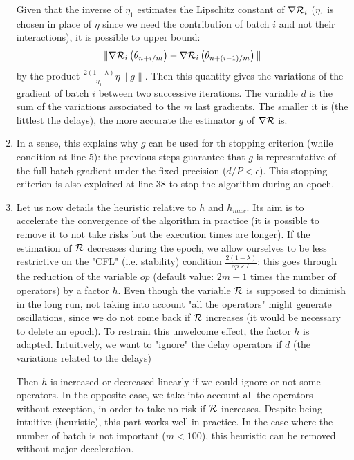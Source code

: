 \begin{enumerate}
\begin{equation*}
	\end{equation*}
	Given that the inverse of $\eta_1$ estimates the Lipschitz constant of $\nabla \mathcal{R}_i$ ($\eta_1$ is chosen in place of $\eta$ since we need the contribution of batch $i$ and not their interactions), it is possible to upper bound:
	\begin{equation*}
		\|\nabla \mathcal{R}_i\left(\theta_{n+i/m}\right)-\nabla \mathcal{R}_i\left(\theta_{n+(i-1)/m}\right)\|
	\end{equation*}
	by the product $\frac{2(1-\lambda)}{\eta_1}\eta\|g\|$. Then this quantity gives the variations of the gradient of batch $i$ between two successive iterations. The variable
        $d$ is the sum of the variations associated to the $m$ last gradients. The smaller it is (the littlest the delays), the more accurate the estimator $g$ of $\nabla \mathcal{R}$ is.
      \item In a sense, this explains why $g$ can be used for th stopping criterion (while condition at line 5): the previous steps guarantee that $g$ is representative of the
        full-batch gradient under the fixed precision ($d/P<\epsilon$). This stopping criterion is also exploited at line 38 to stop the algorithm during an epoch.   
      \item Let us now details the heuristic relative to $h$ and $h_{max}$. Its aim is to accelerate the convergence of the algorithm in practice (it is possible to remove it to not take risks but the
        execution times are longer). If the estimation of $\mathcal{R}$ decreases during the epoch, we allow ourselves to be less restrictive on the "CFL" (i.e. stability) condition $\frac{2(1-\lambda)}{op\times L}$:
          this goes through the reduction of the variable $op$ (default value: $2m-1$ times the number of operators) by a factor $h$. Even though the variable $\mathcal{R}$ is supposed to diminish
          in the long run, not taking into account "all the operators" might generate oscillations, since we do not come back if $\mathcal{R}$ increases (it would be necessary to delete an
          epoch). To restrain this unwelcome effect, the factor $h$ is adapted. Intuitively, we want to "ignore" the delay operators if $d$ (the variations related to the delays)

          Then $h$ is increased or decreased linearly if we could ignore or not some operators. In the opposite case, we take into account all the operators without exception, in order to take no risk if $\mathcal{R}$ increases. Despite being intuitive (heuristic), this part works well in practice. In the case where the number of batch is not important ($m<100$), this heuristic can be removed without major deceleration. 
\end{enumerate}    

